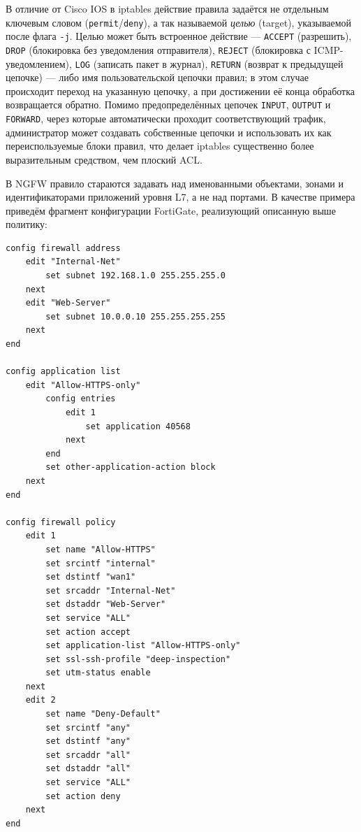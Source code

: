 В отличие от Cisco IOS в iptables действие правила задаётся не отдельным ключевым словом (\texttt{permit}/\texttt{deny}), а так называемой \emph{целью} (target), указываемой после флага \texttt{-j}. Целью может быть встроенное действие --- \texttt{ACCEPT} (разрешить), \texttt{DROP} (блокировка без уведомления отправителя), \texttt{REJECT} (блокировка с ICMP-уведомлением), \texttt{LOG} (записать пакет в журнал), \texttt{RETURN} (возврат к предыдущей цепочке) --- либо имя пользовательской цепочки правил; в этом случае происходит переход на указанную цепочку, а при достижении её конца обработка возвращается обратно. Помимо предопределённых цепочек \texttt{INPUT}, \texttt{OUTPUT} и \texttt{FORWARD}, через которые автоматически проходит соответствующий трафик, администратор может создавать собственные цепочки и использовать их как переиспользуемые блоки правил, что делает iptables существенно более выразительным средством, чем плоский ACL.

В NGFW правило стараются задавать над именованными объектами, зонами и идентификаторами приложений уровня L7, а не над портами. В качестве примера приведём фрагмент конфигурации FortiGate, реализующий описанную выше политику:

\begin{verbatim}
config firewall address
    edit "Internal-Net"
        set subnet 192.168.1.0 255.255.255.0
    next
    edit "Web-Server"
        set subnet 10.0.0.10 255.255.255.255
    next
end

config application list
    edit "Allow-HTTPS-only"
        config entries
            edit 1
                set application 40568
            next
        end
        set other-application-action block
    next
end

config firewall policy
    edit 1
        set name "Allow-HTTPS"
        set srcintf "internal"
        set dstintf "wan1"
        set srcaddr "Internal-Net"
        set dstaddr "Web-Server"
        set service "ALL"
        set action accept
        set application-list "Allow-HTTPS-only"
        set ssl-ssh-profile "deep-inspection"
        set utm-status enable
    next
    edit 2
        set name "Deny-Default"
        set srcintf "any"
        set dstintf "any"
        set srcaddr "all"
        set dstaddr "all"
        set service "ALL"
        set action deny
    next
end
\end{verbatim}

